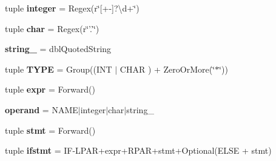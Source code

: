 \begin{DoxyCompactItemize}
\item 
\hypertarget{classxutools_1_1parsers_1_1_subset_c_parser_ab2dbd59c46ad9070b79976add75e76b8}{tuple {\bfseries integer} = Regex(r\char`\"{}\mbox{[}+-\/\mbox{]}?\textbackslash{}d+\char`\"{})}\label{classxutools_1_1parsers_1_1_subset_c_parser_ab2dbd59c46ad9070b79976add75e76b8}

\item 
\hypertarget{classxutools_1_1parsers_1_1_subset_c_parser_a7066a9617bab540fdd20ac4cefed628a}{tuple {\bfseries char} = Regex(r\char`\"{}'.'\char`\"{})}\label{classxutools_1_1parsers_1_1_subset_c_parser_a7066a9617bab540fdd20ac4cefed628a}

\item 
\hypertarget{classxutools_1_1parsers_1_1_subset_c_parser_ac594f8e636d9fc54b7e87c8e7c898dfb}{{\bfseries string\-\_\-} = dbl\-Quoted\-String}\label{classxutools_1_1parsers_1_1_subset_c_parser_ac594f8e636d9fc54b7e87c8e7c898dfb}

\item 
\hypertarget{classxutools_1_1parsers_1_1_subset_c_parser_a6146a51c60e960ea0612e302c236f7e8}{tuple {\bfseries T\-Y\-P\-E} = Group((I\-N\-T $|$ C\-H\-A\-R ) + Zero\-Or\-More(\char`\"{}$\ast$\char`\"{}))}\label{classxutools_1_1parsers_1_1_subset_c_parser_a6146a51c60e960ea0612e302c236f7e8}

\item 
\hypertarget{classxutools_1_1parsers_1_1_subset_c_parser_ac0e145ca427b2558b28a36e2964456d4}{tuple {\bfseries expr} = Forward()}\label{classxutools_1_1parsers_1_1_subset_c_parser_ac0e145ca427b2558b28a36e2964456d4}

\item 
\hypertarget{classxutools_1_1parsers_1_1_subset_c_parser_a4ad9b750c0fc749996f18b6cbbe6def4}{{\bfseries operand} = N\-A\-M\-E$|$integer$|$char$|$string\-\_\-}\label{classxutools_1_1parsers_1_1_subset_c_parser_a4ad9b750c0fc749996f18b6cbbe6def4}

\item 
\hypertarget{classxutools_1_1parsers_1_1_subset_c_parser_a4d5b8565a04bc20822c5c77478acf18a}{tuple {\bfseries stmt} = Forward()}\label{classxutools_1_1parsers_1_1_subset_c_parser_a4d5b8565a04bc20822c5c77478acf18a}

\item 
\hypertarget{classxutools_1_1parsers_1_1_subset_c_parser_a9ef774258d0ba18706860b451a13a939}{tuple {\bfseries ifstmt} = I\-F-\/L\-P\-A\-R+expr+R\-P\-A\-R+stmt+Optional(E\-L\-S\-E + stmt)}\label{classxutools_1_1parsers_1_1_subset_c_parser_a9ef774258d0ba18706860b451a13a939}


\end{DoxyCompactItemize}
